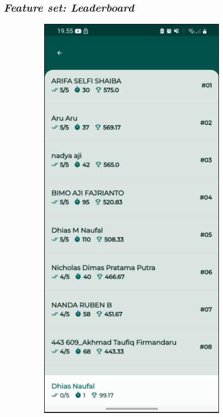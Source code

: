 \subsection{\textit{Feature set: Leaderboard}}
\begin{figure}[H]
	\centering
	\begin{subfigure}[b]{0.23\textwidth}
		\centering
	  \includegraphics[width=\linewidth]{contents/chapter-3/images/HF-Leaderboard.png}

\end{subfigure}
\end{figure}
